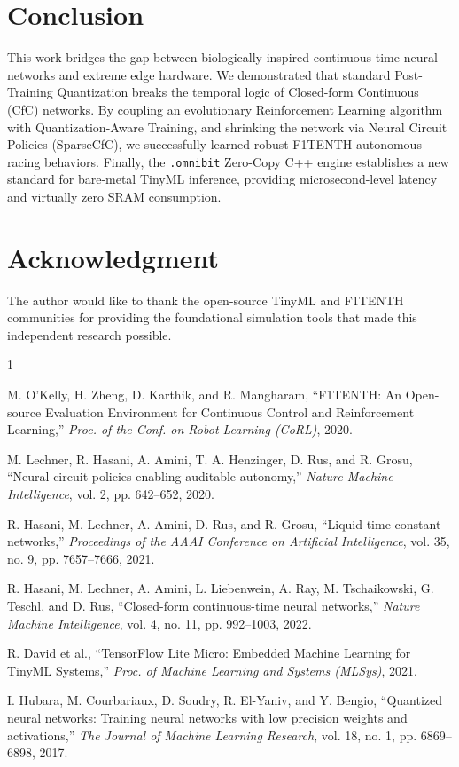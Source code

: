 \documentclass[lettersize,journal]{IEEEtran}
\begin{document}
\section{Conclusion}
This work bridges the gap between biologically inspired continuous-time neural networks and extreme edge hardware. We demonstrated that standard Post-Training Quantization breaks the temporal logic of Closed-form Continuous (CfC) networks. By coupling an evolutionary Reinforcement Learning algorithm with Quantization-Aware Training, and shrinking the network via Neural Circuit Policies (SparseCfC), we successfully learned robust F1TENTH autonomous racing behaviors. Finally, the \texttt{.omnibit} Zero-Copy C++ engine establishes a new standard for bare-metal TinyML inference, providing microsecond-level latency and virtually zero SRAM consumption.

\section*{Acknowledgment}
The author would like to thank the open-source TinyML and F1TENTH communities for providing the foundational simulation tools that made this independent research possible.

\begin{thebibliography}{1}


M. O'Kelly, H. Zheng, D. Karthik, and R. Mangharam, ``F1TENTH: An Open-source Evaluation Environment for Continuous Control and Reinforcement Learning,'' \textit{Proc. of the Conf. on Robot Learning (CoRL)}, 2020.

M. Lechner, R. Hasani, A. Amini, T. A. Henzinger, D. Rus, and R. Grosu, ``Neural circuit policies enabling auditable autonomy,'' \textit{Nature Machine Intelligence}, vol. 2, pp. 642--652, 2020.

R. Hasani, M. Lechner, A. Amini, D. Rus, and R. Grosu, ``Liquid time-constant networks,'' \textit{Proceedings of the AAAI Conference on Artificial Intelligence}, vol. 35, no. 9, pp. 7657--7666, 2021.

R. Hasani, M. Lechner, A. Amini, L. Liebenwein, A. Ray, M. Tschaikowski, G. Teschl, and D. Rus, ``Closed-form continuous-time neural networks,'' \textit{Nature Machine Intelligence}, vol. 4, no. 11, pp. 992--1003, 2022.

R. David et al., ``TensorFlow Lite Micro: Embedded Machine Learning for TinyML Systems,'' \textit{Proc. of Machine Learning and Systems (MLSys)}, 2021.

I. Hubara, M. Courbariaux, D. Soudry, R. El-Yaniv, and Y. Bengio, ``Quantized neural networks: Training neural networks with low precision weights and activations,'' \textit{The Journal of Machine Learning Research}, vol. 18, no. 1, pp. 6869--6898, 2017.

\end{thebibliography}

\vfill
\end{document}
